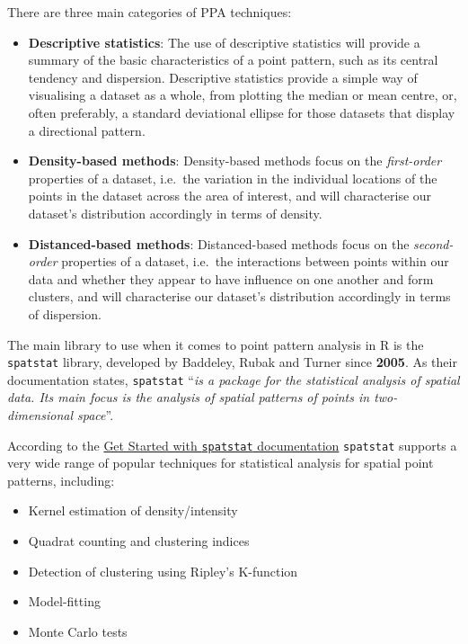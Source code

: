 \documentclass[
]{book}
\providecommand{\tightlist}{%
  \setlength{\itemsep}{0pt}\setlength{\parskip}{0pt}}
\begin{document}
There are three main categories of PPA techniques:

\begin{itemize}
\tightlist
\item
  \textbf{Descriptive statistics}: The use of descriptive statistics will provide a summary of the basic characteristics of a point pattern, such as its central tendency and dispersion. Descriptive statistics provide a simple way of visualising a dataset as a whole, from plotting the median or mean centre, or, often preferably, a standard deviational ellipse for those datasets that display a directional pattern.
\item
  \textbf{Density-based methods}: Density-based methods focus on the \emph{first-order} properties of a dataset, i.e.~the variation in the individual locations of the points in the dataset across the area of interest, and will characterise our dataset's distribution accordingly in terms of density.
\item
  \textbf{Distanced-based methods}: Distanced-based methods focus on the \emph{second-order} properties of a dataset, i.e.~the interactions between points within our data and whether they appear to have influence on one another and form clusters, and will characterise our dataset's distribution accordingly in terms of dispersion.
\end{itemize}

The main library to use when it comes to point pattern analysis in R is the \texttt{spatstat} library, developed by Baddeley, Rubak and Turner since \textbf{2005}. As their documentation states, \texttt{spatstat} ``\emph{is a package for the statistical analysis of spatial data. Its main focus is the analysis of spatial patterns of points in two-dimensional space}''.

According to the \href{https://cran.r-project.org/web/packages/spatstat/vignettes/getstart.pdf}{Get Started with \texttt{spatstat} documentation} \texttt{spatstat} supports a very wide range of popular techniques for statistical analysis for spatial point patterns, including:

\begin{itemize}
\tightlist
\item
  Kernel estimation of density/intensity
\item
  Quadrat counting and clustering indices
\item
  Detection of clustering using Ripley's K-function
\item
  Model-fitting
\item
  Monte Carlo tests
\end{itemize}
\end{document}
